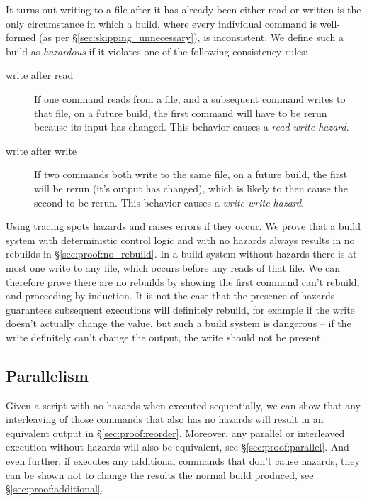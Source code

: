It turns out writing to a file after it has already been either read or written is the only circumstance in which a build, where every individual command is well-formed (as per \S\ref{sec:skipping_unnecessary}), is inconsistent. We define such a build as \emph{hazardous} if it violates one of the following consistency rules:

\begin{description}
\item[write after read] If one command reads from a file, and a subsequent command writes to that file, on a future build, the first command will have to be rerun because its input has changed.  This behavior causes a \emph{read-write hazard}.
\item[write after write] If two commands both write to the same file, on a future build, the first will be rerun (it's output has changed), which is likely to then cause the second to be rerun.  This behavior causes a \emph{write-write hazard}.
\end{description}

Using tracing \Rattle spots hazards and raises errors if they occur. We prove that a build system with deterministic control logic and with no hazards always results in no rebuilds in \S\ref{sec:proof:no_rebuild}. In a build system without hazards there is at most one write to any file, which occurs before any reads of that file. We can therefore prove there are no rebuilds by showing the first command can't rebuild, and proceeding by induction. It is not the case that the presence of hazards guarantees subsequent executions will definitely rebuild, for example if the write doesn't actually change the value, but such a build system is dangerous -- if the write definitely can't change the output, the write should not be present.

\subsection{Parallelism}

Given a script with no hazards when executed sequentially, we can show that any interleaving of those commands that also has no hazards will result in an equivalent output in \S\ref{sec:proof:reorder}. Moreover, any parallel or interleaved execution without hazards will also be equivalent, see \S\ref{sec:proof:parallel}. And even further, if \Rattle executes any additional commands that don't cause hazards, they can be shown not to change the results the normal build produced, see \S\ref{sec:proof:additional}.

